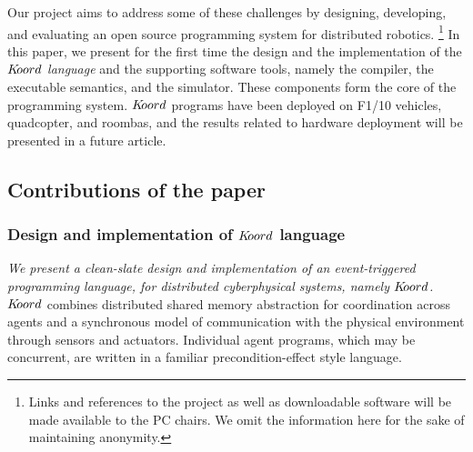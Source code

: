 
Our project aims to address some of these challenges by designing, developing, and evaluating an open source programming system for distributed robotics. \footnote{Links and references to the project as well as downloadable software will be made available to the PC chairs. We omit the information here for the sake of maintaining anonymity.} In this paper, we present for the first time the design and the implementation of the  {\em $K\kern-2pt oord$ language} and the supporting software tools, namely the compiler, the \K executable semantics, and the simulator. These components form the  core of the programming system. $K\kern-2pt oord$ programs have been deployed on F1/10 vehicles, quadcopter, and roombas, and the results related to hardware deployment will be presented in a future article. 





%
%
\subsection{Contributions of the paper}
\subsubsection{Design and implementation of $K\kern-2pt oord$ language}
{\em We present a clean-slate design and implementation of an event-triggered programming language, for distributed cyberphysical systems, namely $K\kern-2pt oord$.} 
%
$K\kern-2pt oord$ combines distributed shared memory abstraction for coordination across agents and a synchronous model of communication with the physical environment through sensors and actuators. Individual agent programs, which may be concurrent, are written in a familiar precondition-effect style language.
%

